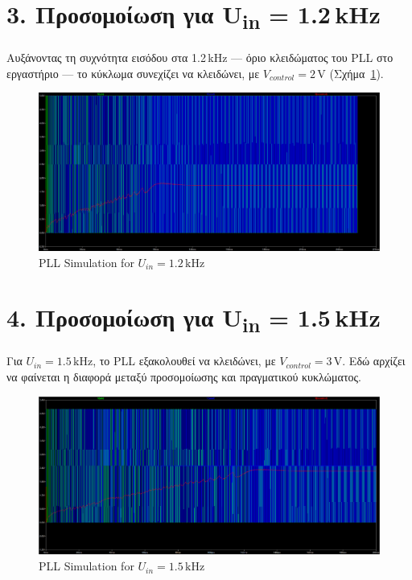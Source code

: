 \documentclass[11pt,letterpaper]{article}
\begin{document}
\section*{3. Προσομοίωση για U\textsubscript{in} = 1.2 kHz}
Αυξάνοντας τη συχνότητα εισόδου στα 1.2 kHz — όριο κλειδώματος του PLL στο εργαστήριο — το κύκλωμα συνεχίζει να κλειδώνει, με \( V_{control} = 2\,\text{V} \) (Σχήμα~\ref{fig:pll_simulation_1.2khz}).

\begin{figure}[H]
    \centering
    \includegraphics[width=\textwidth]{figures/sim2.png}
    \caption{PLL Simulation for \( U_{in} = 1.2\,\text{kHz} \)}
    \label{fig:pll_simulation_1.2khz}
\end{figure}

\section*{4. Προσομοίωση για U\textsubscript{in} = 1.5 kHz}
Για \( U_{in} = 1.5\,\text{kHz} \), το PLL εξακολουθεί να κλειδώνει, με \( V_{control} = 3\,\text{V} \). Εδώ αρχίζει να φαίνεται η διαφορά μεταξύ προσομοίωσης και πραγματικού κυκλώματος.

\begin{figure}[H]
    \centering
    \includegraphics[width=\textwidth]{figures/sim3.png}
    \caption{PLL Simulation for \( U_{in} = 1.5\,\text{kHz} \)}
    \label{fig:pll_simulation_1.5khz}
\end{figure}
\end{document}
